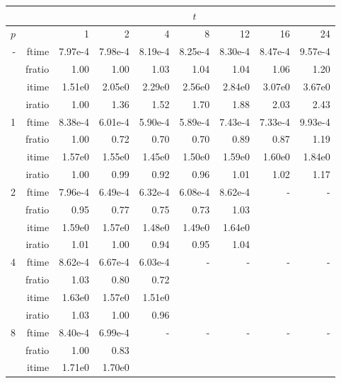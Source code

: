 \documentclass[a4]{article}
\begin{document}
\begin{table}
\begin{center}
\begin{tabular}{|r|r|r|r|r|r|r|r|r|}
\hline 
     &  & \multicolumn{7}{c|}{$t$} \\ \hline
    $p$  &  & 1           & 2    & 4    & 8    & 12   & 16    & 24  \\ \hline\hline
    -  & ftime &  7.97e-4 &   7.98e-4 &   8.19e-4 &   8.25e-4 &   8.30e-4 &   8.47e-4 &   9.57e-4     \\ 
      & fratio &   1.00 &   1.00 &   1.03 &   1.04 &   1.04 &   1.06 &   1.20    \\ 
     & itime &   1.51e0 &   2.05e0 &   2.29e0 &   2.56e0 &   2.84e0 &   3.07e0 &   3.67e0     \\ 
     & iratio &   1.00 &   1.36 &   1.52 &   1.70 &   1.88 &   2.03 &   2.43     \\ \hline \hline
    1  & ftime &  8.38e-4 &  6.01e-4 &  5.90e-4 &  5.89e-4 &  7.43e-4 &  7.33e-4 &  9.93e-4  \\ 
      & fratio & 1.00 &  0.72 &  0.70 &  0.70 &  0.89 &  0.87 &  1.19   \\ 
     & itime & 1.57e0 &   1.55e0 &   1.45e0 &   1.50e0 &   1.59e0 &   1.60e0 &   1.84e0  \\ 
     & iratio & 1.00 &   0.99 &   0.92 &   0.96 &   1.01 &   1.02 &   1.17  \\ \hline
    2  & ftime &  7.96e-4 &  6.49e-4 &  6.32e-4 &  6.08e-4 &  8.62e-4  & - & - \\ 
      & fratio &   0.95 &  0.77 &  0.75 &  0.73 &  1.03   &  &  \\
      & itime &  1.59e0 &   1.57e0 &   1.48e0 &   1.49e0 &   1.64e0   &  &  \\
      & iratio &  1.01 &   1.00 &   0.94 &   0.95 &   1.04  &  &  \\ \hline
    4  & ftime & 8.62e-4 &  6.67e-4 &  6.03e-4   & - & - & - & - \\ 
      & fratio &   1.03 &  0.80 &  0.72  &  &  &  &  \\
      & itime &  1.63e0 &   1.57e0 &   1.51e0   &  & & & \\
      & iratio &  1.03 &   1.00 &   0.96  &  & & &  \\ \hline
    8  & ftime &  8.40e-4 &  6.99e-4    & - & - & - & - & - \\ 
      & fratio & 1.00 &  0.83  &  &  &  &  &  \\
      & itime &  1.71e0 &   1.70e0   &  & & & & \\

\end{tabular}
\end{center}
\end{table}
\end{document}
